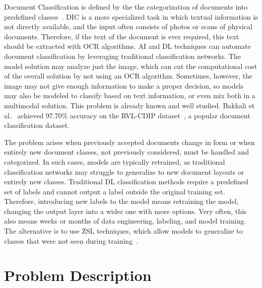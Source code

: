Document Classification is defined by the the categorization of documents into predefined classes~\cite{liu_document_2021}. \gls{DIC} is a more specialized task in which textual information is not directly available, and the input often consists of photos or scans of physical documents. Therefore, if the text of the document is ever required, this text should be extracted with \gls{OCR} algorithms. \gls{AI} and \gls{DL} techniques can automate document classification by leveraging traditional classification networks. The model solution may analyze just the image, which can cut the computational cost of the overall solution by not using an \gls{OCR} algorithm. Sometimes, however, the image may not give enough information to make a proper decision, so models may also be modeled to classify based on text information, or even mix both in a multimodal solution. This problem is already known and well studied. Bakkali et al.~\cite{bakkali_eaml_2021} achieved $97.70\%$ accuracy on the RVL-CDIP dataset~\cite{harley2015rvlcdip}, a popular document classification dataset.

The problem arises when previously accepted documents change in form or when entirely new document classes, not previously considered, must be handled and categorized. In such cases, models are typically retrained, as traditional classification networks may struggle to generalize to new document layouts or entirely new classes. Traditional \gls{DL} classification methods require a predefined set of labels and cannot output a label outside the original training set. Therefore, introducing new labels to the model means retraining the model, changing the output layer into a wider one with more options. Very often, this also means weeks or months of data engineering, labeling, and model training. The alternative is to use \gls{ZSL} techniques, which allow models to generalize to classes that were not seen during training~\cite{xian_zero-shot_2019}.


\section{Problem Description}
\label{sec:problem}

